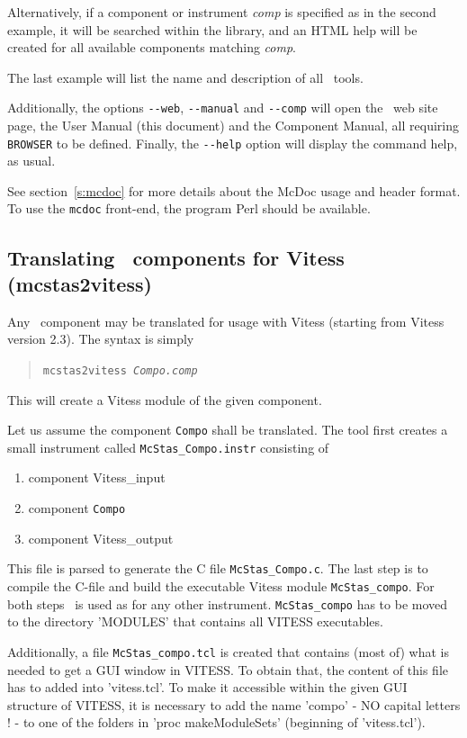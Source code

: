 Alternatively, if a component or instrument {\it comp} is specified as in the
second example, it will be searched within the library, and an HTML help will be
created for all available components matching {\it comp}.

The last example will list the name and description of all \MCS\ tools.

Additionally, the options \verb+--web+, \verb+--manual+ and \verb+--comp+ will
open the \MCS\ web site page, the User Manual (this document) and the Component
Manual, all requiring \verb+BROWSER+ to be defined. Finally, the \verb+--help+
option will display the command help, as usual.

See section~\ref{s:mcdoc} for more details about the McDoc usage and header
format.  To use the \verb+mcdoc+ front-end, the program Perl should be
available.

\subsection{Translating \MCS\ components for Vitess (mcstas2vitess)}
\label{s:mcstas2vitess}

Any \MCS\ component may be translated for usage with Vitess (starting from
Vitess version 2.3). The syntax is simply 
\begin{quote}
  \texttt{mcstas2vitess {\it Compo.comp\/}}
\end{quote}
This will create a Vitess module of the given component.

Let us assume the component \verb+Compo+ shall be translated. The tool first
creates a small instrument called \verb+McStas_Compo.instr+ consisting of
\begin{enumerate}
\item component Vitess\_input
\item component \verb+Compo+
\item component Vitess\_output
\end{enumerate}

This file is parsed to generate the C file \verb+McStas_Compo.c+. The last step
is to compile the C-file and build the executable Vitess module
\verb'McStas_compo'. For both steps \MCS\ is used as for any other
instrument. \verb'McStas_compo' has to be moved to the directory 'MODULES' that
contains all VITESS executables.

Additionally, a file \verb'McStas_compo.tcl' is created that contains (most of)
what is needed to get a GUI window in VITESS. To obtain that, the content of
this file has to added into 'vitess.tcl'. To make it accessible within the given
GUI structure of VITESS, it is necessary to add the name 'compo' - NO capital
letters ! - to one of the folders in 'proc makeModuleSets{}' (beginning of
'vitess.tcl').

